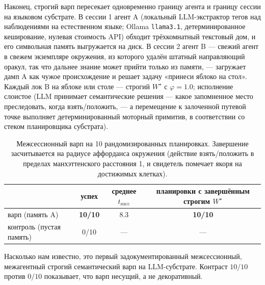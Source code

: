 \documentclass{article}
\newcommand{\method}[1]{\texttt{#1}}
\newcommand{\wstar}{W^{\star}}
\begin{document}
Наконец, строгий варп пересекает одновременно границу агента и
границу сессии на языковом субстрате. В сессии 1 агент A (локальный
LLM-экстрактор тегов над наблюдениями на естественном языке; Ollama
\method{llama3.1}, детерминированное кеширование, нулевая стоимость
API) обходит трёхкомнатный текстовый дом, и его символьная память
выгружается на диск. В сессии 2 агент B --- свежий агент в свежем
экземпляре окружения, из которого удалён штатный направляющий оракул,
так что дальнее знание может прийти только из памяти, --- загружает
дамп A как чужое происхождение и решает задачу «принеси яблоко на
стол». Каждый лок B на яблоке или столе --- строгий $\wstar$ с
$\varphi{=}1.0$; исполнение слоистое (LLM принимает семантические
решения --- какое запомненное место преследовать, когда взять/положить,
--- а перемещение к залоченной путевой точке выполняет
детерминированный моторный примитив, в соответствии со стеком
планировщика субстрата).

\begin{table}[h]
\centering
\caption{Межсессионный варп на 10 рандомизированных планировках.
Завершение засчитывается на радиусе аффорданса окружения (действие
взять/положить в пределах манхэттенского расстояния 1, и свидетель
помечает якоря на достижимых клетках).}
\label{p2:tab:llm}
\small
\begin{tabular}{lccc}
\toprule
 & успех & среднее $t_{\text{succ}}$ & планировки с завершённым строгим $\wstar$ \\
\midrule
варп (память A) & \textbf{10/10} & 8.3 & \textbf{10/10} \\
контроль (пустая память) & 0/10 & --- & --- \\
\bottomrule
\end{tabular}
\end{table}

Насколько нам известно, это первый задокументированный межсессионный,
межагентный строгий семантический варп на LLM-субстрате. Контраст
$10/10$ против $0/10$ показывает, что варп несущий, а не
декоративный.
\end{document}
